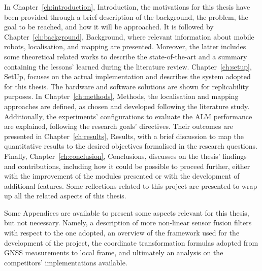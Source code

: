 In Chapter~\ref{ch:introduction}, Introduction, the motivations for this thesis have been provided through a brief description of the background, the problem, the goal to be reached, and how it will be approached.
It is followed by Chapter~\ref{ch:background}, Background, where relevant information about mobile robots, localisation, and mapping are presented.
Moreover, the latter includes some theoretical related works to describe the state-of-the-art and a summary containing the lessons' learned during the literature review.
Chapter~\ref{ch:setup}, SetUp, focuses on the actual implementation and describes the system adopted for this thesis.
The hardware and software solutions are shown for replicability purposes. 
In Chapter~\ref{ch:methods}, Methods, the localisation and mapping approaches are defined, as chosen and developed following the literature study.
Additionally, the experiments' configurations to evaluate the \gls{ALM} performance are explained, following the research goals' directives.
Their outcomes are presented in Chapter~\ref{ch:results}, Results, with a brief discussion to map the quantitative results to the desired objectives formalised in the research questions.
Finally, Chapter~\ref{ch:conclusion}, Conclusions, discusses on the thesis' findings and contributions, including how it could be possible to proceed further, either with the improvement of the modules presented or with the development of additional features.
Some reflections related to this project are presented to wrap up all the related aspects of this thesis.

Some Appendices are available to present some aspects relevant for this thesis, but not necessary.
Namely, a description of more non-linear sensor fusion filters with respect to the one adopted, an overview of the framework used for the development of the project, the coordinate transformation formulas adopted from \gls{GNSS} measurements to local frame, and ultimately an analysis on the competitors' implementations available.

\cleardoublepage
